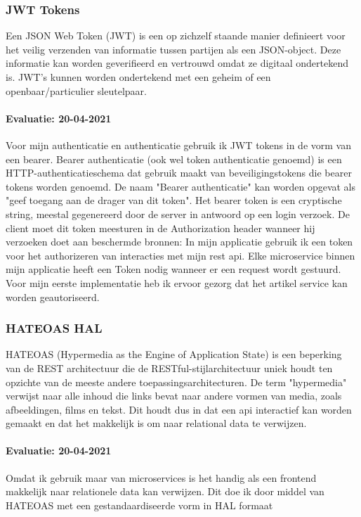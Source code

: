 \subsubsection{JWT Tokens}
Een JSON Web Token (JWT) is een op zichzelf staande manier definieert voor het veilig verzenden van informatie tussen partijen als een JSON-object.
Deze informatie kan worden geverifieerd en vertrouwd omdat ze digitaal ondertekend is.
JWT's kunnen worden ondertekend met een geheim of een openbaar/particulier sleutelpaar.
\paragraph{Evaluatie: 20-04-2021}
Voor mijn authenticatie en authenticatie gebruik ik JWT tokens in de vorm van een bearer.
Bearer authenticatie (ook wel token authenticatie genoemd) is een HTTP-authenticatieschema dat gebruik maakt van beveiligingstokens die bearer tokens worden genoemd.
De naam "Bearer authenticatie" kan worden opgevat als "geef toegang aan de drager van dit token".
Het bearer token is een cryptische string, meestal gegenereerd door de server in antwoord op een login verzoek.
De client moet dit token meesturen in de Authorization header wanneer hij verzoeken doet aan beschermde bronnen:
In mijn applicatie gebruik ik een token voor het authorizeren van interacties met mijn rest api.
Elke microservice binnen mijn applicatie heeft een Token nodig wanneer er een request wordt gestuurd.
Voor mijn eerste implementatie heb ik ervoor gezorg dat het artikel service kan worden geautoriseerd.


\subsubsection{HATEOAS HAL}
HATEOAS (Hypermedia as the Engine of Application State) is een beperking van de REST architectuur die de RESTful-stijlarchitectuur uniek houdt ten opzichte van de meeste andere toepassingsarchitecturen.
De term "hypermedia" verwijst naar alle inhoud die links bevat naar andere vormen van media, zoals afbeeldingen, films en tekst.
Dit houdt dus in dat een api interactief kan worden gemaakt en dat het makkelijk is om naar relational data te verwijzen.
\paragraph{Evaluatie: 20-04-2021}
Omdat ik gebruik maar van microservices is het handig als een frontend makkelijk naar relationele data kan verwijzen.
Dit doe ik door middel van HATEOAS met een gestandaardiseerde vorm in HAL formaat





